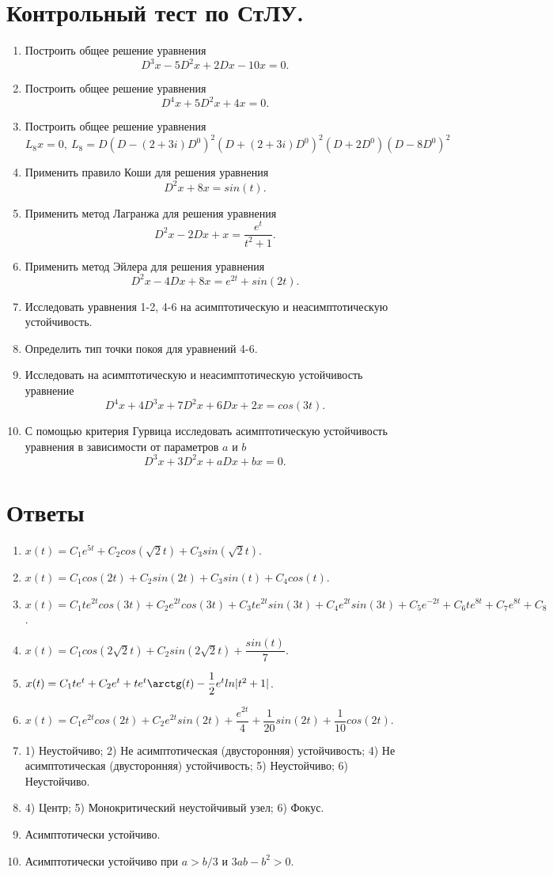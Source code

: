 \documentclass[a4paper, 12pt]{article}
\begin{document}
	\section*{Контрольный тест по СтЛУ.}
	\begin{enumerate}
		\item Построить общее решение уравнения
		$$D^3x - 5D^2x + 2Dx - 10x = 0.$$
		\item Построить общее решение уравнения
		$$D^4x + 5D^2x + 4x = 0.$$
		\item Построить общее решение уравнения
		$$L_8x = 0,\ L_8 = D(D-(2+3i)D^0)^2(D+(2+3i)D^0)^2(D + 2D^0)(D - 8D^0)^2$$
		\item Применить правило Коши для решения уравнения
		$$D^2x + 8x = sin(t).$$
		\item Применить метод Лагранжа для решения уравнения
		$$D^2x - 2Dx + x = \dfrac{e^t}{t^2 + 1}.$$
		\item Применить метод Эйлера для решения уравнения
		$$D^2x - 4Dx + 8x = e^{2t} + sin(2t).$$
		\item Исследовать уравнения 1-2, 4-6 на асимптотическую и неасимптотическую устойчивость.
		\item Определить тип точки покоя для уравнений 4-6.
		\item Исследовать на асимптотическую и неасимптотическую устойчивость уравнение
		$$D^4x + 4D^3x + 7D^2x + 6Dx + 2x = cos(3t).$$
		\item С помощью критерия Гурвица исследовать асимптотическую устойчивость уравнения в зависимости от параметров $a$ и $b$
		$$D^3x + 3D^2x + aDx + bx = 0.$$
	\end{enumerate}
	\newpage\section*{Ответы}\begin{enumerate}
		\item $x(t) = C_1e^{5t} + C_2cos(\sqrt{2}t) + C_3sin(\sqrt{2}t)$.
		\item $x(t) = C_1cos(2t) + C_2sin(2t) + C_3sin(t) + C_4cos(t)$.
		\item $x(t) = C_1te^{2t}cos(3t) + C_2e^{2t}cos(3t) + C_3te^{2t}sin(3t) + C_4e^{2t}sin(3t) + C_5e^{-2t} + C_6te^{8t} + C_7e^{8t} + C_8$.
		\item $x(t) = C_1cos(2\sqrt{2}t) + C_2sin(2\sqrt{2}t) + \dfrac{sin(t)}{7}.$
		\item $x(t) = C_1te^t + C_2e^t + te^t \arctg(t) - \dfrac{1}{2} e^t ln|t^2 + 1|$.
		\item $x(t) = C_1e^{2t}cos(2t) + C_2e^{2t}sin(2t) + \dfrac{e^{2t}}{4} + \dfrac{1}{20} sin(2t) + \dfrac{1}{10}cos(2t).$
		\item 1) Неустойчиво; 2) Не асимптотическая (двусторонняя) устойчивость; 4) Не асимптотическая (двусторонняя) устойчивость; 5) Неустойчиво; 6) Неустойчиво.
		\item 4) Центр; 5) Монокритический неустойчивый узел; 6) Фокус.
		\item Асимптотически устойчиво.
		\item Асимптотически устойчиво при $a > b/3$ и $3ab - b^2 > 0$.
	\end{enumerate}
\end{document}
